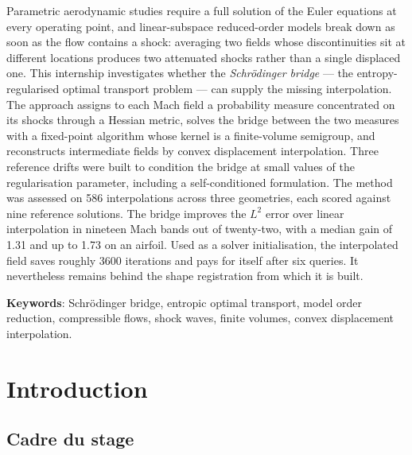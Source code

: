 \documentclass[11pt,a4paper]{article}
\begin{document}
Parametric aerodynamic studies require a full solution of the Euler equations at every
operating point, and linear-subspace reduced-order models break down as soon as the flow
contains a shock: averaging two fields whose discontinuities sit at different locations
produces two attenuated shocks rather than a single displaced one. This internship
investigates whether the \emph{Schrödinger bridge} — the entropy-regularised optimal
transport problem — can supply the missing interpolation. The approach assigns to each
Mach field a probability measure concentrated on its shocks through a Hessian metric,
solves the bridge between the two measures with a fixed-point algorithm whose kernel is
a finite-volume semigroup, and reconstructs intermediate fields by convex displacement
interpolation. Three reference drifts were built to condition the bridge at small values
of the regularisation parameter, including a self-conditioned formulation. The method was
assessed on 586 interpolations across three geometries, each scored against nine
reference solutions. The bridge improves the $L^2$ error over linear interpolation in
nineteen Mach bands out of twenty-two, with a median gain of 1.31 and up to 1.73 on an
airfoil. Used as a solver initialisation, the interpolated field saves roughly 3600
iterations and pays for itself after six queries. It nevertheless remains behind the
shape registration from which it is built.

\vspace{0.4em}
\noindent\textbf{Keywords}: Schrödinger bridge, entropic optimal transport, model order
reduction, compressible flows, shock waves, finite volumes, convex displacement
interpolation.

\clearpage

\setcounter{tocdepth}{2}
\tableofcontents
\clearpage

\section{Introduction}

\subsection{Cadre du stage}
\end{document}
